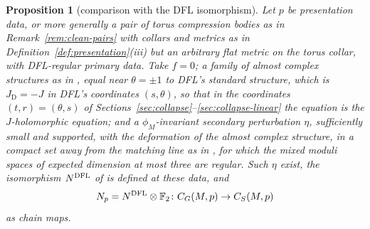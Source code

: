 \documentclass[11pt]{amsart}
\newtheorem{proposition}[theorem]{Proposition}
\theoremstyle{definition}
\theoremstyle{remark}
\theoremstyle{plain}
\numberwithin{equation}{section}
\newcommand{\FF}{\mathbb{F}_2}
\begin{document}
\begin{proposition}[comparison with the DFL isomorphism]\label{prop:dfl-comparison}
Let $p$ be presentation data, or more generally a pair of torus compression bodies as in
Remark~\ref{rem:clean-pairs} with collars and metrics as in
Definition~\ref{def:presentation}(iii) but an arbitrary flat metric on the torus collar, with
DFL-regular primary data. Take $f=0$; a
family of almost complex structures as in \cite[Section~3.1 and Lemma~2.35]{DFL},
equal near $\theta=\pm1$ to DFL's standard structure, which is
$J_{\mathrm D}=-J$ in DFL's coordinates $(s,\theta)$, so that in the coordinates
$(t,r)=(\theta,s)$ of Sections~\ref{sec:collapse}--\ref{sec:collapse-linear} the
equation is the $J$-holomorphic equation; and a $\phi_M$-invariant secondary perturbation
$\eta$, sufficiently small and supported, with the deformation of the almost complex
structure, in a compact set away from the matching line as in
\cite[Proposition~3.23(i)]{DFL}, for which the mixed moduli spaces of expected dimension
at most three are regular. Such $\eta$ exist, the isomorphism $N^{\rm DFL}$ of
\cite[Theorem~3.29]{DFL} is defined at these data, and
\[
N_p=N^{\rm DFL}\otimes\FF\colon C_G(M,p)\to C_S(M,p)
\]
as chain maps.
\end{proposition}
\end{document}
